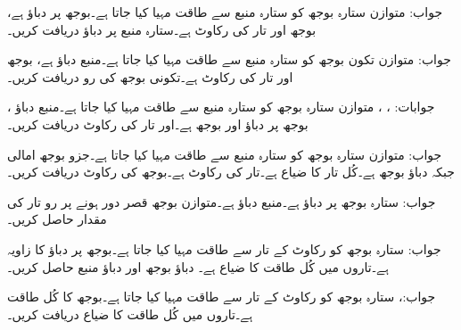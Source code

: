 جواب: 
متوازن ستارہ بوجھ کو ستارہ منبع  سے طاقت مہیا کیا جاتا ہے۔بوجھ پر دباؤ   ہے، بوجھ
  اور تار کی رکاوٹ  ہے۔ستارہ منبع پر دباؤ  دریافت کریں۔

جواب: 
متوازن تکون بوجھ کو ستارہ منبع  سے طاقت مہیا کیا جاتا ہے۔منبع دباؤ   ہے، بوجھ
  اور تار کی رکاوٹ  ہے۔تکونی بوجھ کی رو دریافت کریں۔

جوابات: ،  ،  
متوازن ستارہ بوجھ کو ستارہ منبع  سے طاقت مہیا کیا جاتا ہے۔منبع دباؤ  ، بوجھ پر دباؤ
  اور بوجھ   ہے۔اور تار کی رکاوٹ  دریافت کریں۔

جواب: 
متوازن ستارہ بوجھ کو ستارہ منبع  سے طاقت مہیا کیا جاتا ہے۔جزو بوجھ  امالی  جبکہ دباؤ  بوجھ  ہے۔کُل تار کا ضیاع  ہے۔تار کی رکاوٹ  ہے۔بوجھ کی رکاوٹ دریافت کریں۔

جواب:
ستارہ بوجھ  پر دباؤ  ہے۔منبع 
دباؤ ہے۔متوازن بوجھ قصر دور ہونے پر رو تار کی مقدار حاصل کریں۔

جواب:
ستارہ بوجھ  کو  رکاوٹ کے تار سے طاقت مہیا کیا جاتا ہے۔بوجھ پر دباؤ کا زاویہ  ہے۔تاروں میں کُل طاقت کا ضیاع  ہے۔ دباؤ بوجھ اور دباؤ منبع حاصل کریں۔

جواب:، 
ستارہ بوجھ  کو  رکاوٹ کے تار سے طاقت مہیا کیا جاتا ہے۔بوجھ کا کُل طاقت  ہے۔تاروں میں کُل طاقت کا ضیاع دریافت کریں۔

